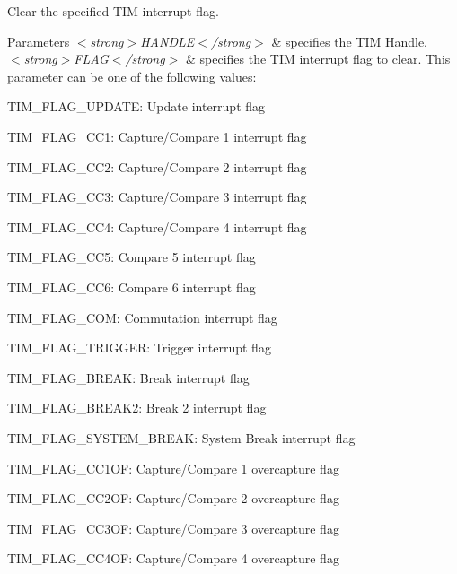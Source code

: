 Clear the specified T\+IM interrupt flag. 


\begin{DoxyParams}{Parameters}
{\em $<$strong$>$\+H\+A\+N\+D\+L\+E$<$/strong$>$} & specifies the T\+IM Handle. \\
\hline
{\em $<$strong$>$\+F\+L\+A\+G$<$/strong$>$} & specifies the T\+IM interrupt flag to clear. This parameter can be one of the following values\+: \begin{DoxyItemize}
\item T\+I\+M\+\_\+\+F\+L\+A\+G\+\_\+\+U\+P\+D\+A\+TE\+: Update interrupt flag \item T\+I\+M\+\_\+\+F\+L\+A\+G\+\_\+\+C\+C1\+: Capture/\+Compare 1 interrupt flag \item T\+I\+M\+\_\+\+F\+L\+A\+G\+\_\+\+C\+C2\+: Capture/\+Compare 2 interrupt flag \item T\+I\+M\+\_\+\+F\+L\+A\+G\+\_\+\+C\+C3\+: Capture/\+Compare 3 interrupt flag \item T\+I\+M\+\_\+\+F\+L\+A\+G\+\_\+\+C\+C4\+: Capture/\+Compare 4 interrupt flag \item T\+I\+M\+\_\+\+F\+L\+A\+G\+\_\+\+C\+C5\+: Compare 5 interrupt flag \item T\+I\+M\+\_\+\+F\+L\+A\+G\+\_\+\+C\+C6\+: Compare 6 interrupt flag \item T\+I\+M\+\_\+\+F\+L\+A\+G\+\_\+\+C\+OM\+: Commutation interrupt flag \item T\+I\+M\+\_\+\+F\+L\+A\+G\+\_\+\+T\+R\+I\+G\+G\+ER\+: Trigger interrupt flag \item T\+I\+M\+\_\+\+F\+L\+A\+G\+\_\+\+B\+R\+E\+AK\+: Break interrupt flag \item T\+I\+M\+\_\+\+F\+L\+A\+G\+\_\+\+B\+R\+E\+A\+K2\+: Break 2 interrupt flag \item T\+I\+M\+\_\+\+F\+L\+A\+G\+\_\+\+S\+Y\+S\+T\+E\+M\+\_\+\+B\+R\+E\+AK\+: System Break interrupt flag \item T\+I\+M\+\_\+\+F\+L\+A\+G\+\_\+\+C\+C1\+OF\+: Capture/\+Compare 1 overcapture flag \item T\+I\+M\+\_\+\+F\+L\+A\+G\+\_\+\+C\+C2\+OF\+: Capture/\+Compare 2 overcapture flag \item T\+I\+M\+\_\+\+F\+L\+A\+G\+\_\+\+C\+C3\+OF\+: Capture/\+Compare 3 overcapture flag \item T\+I\+M\+\_\+\+F\+L\+A\+G\+\_\+\+C\+C4\+OF\+: Capture/\+Compare 4 overcapture flag \end{DoxyItemize}
\\
\hline
\end{DoxyParams}

